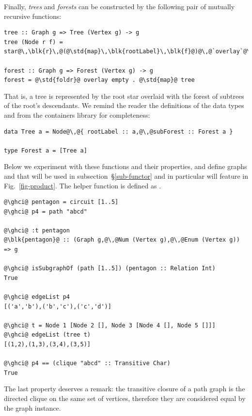 Finally, \emph{trees} and \emph{forests} can be constructed by the following
pair of mutually recursive functions:

\begin{verbatim}
tree :: Graph g => Tree (Vertex g) -> g
tree (Node r f) = star@\,\blk{r}\,@(@\std{map}\,\blk{rootLabel}\,\blk{f}@)@\,@`overlay`@\,\blk{forest}\,f@

forest :: Graph g => Forest (Vertex g) -> g
forest = @\std{foldr}@ overlay empty . @\std{map}@ tree
\end{verbatim}

\noindent
That is, a tree is represented by the root star overlaid with the forest
of subtrees of the root's descendants. We remind the reader the
definitions of the data types  and  from the
\textsf{containers} library for completeness:

\begin{verbatim}
data Tree a = Node@\,@{ rootLabel :: a,@\,@subForest :: Forest a }

type Forest a = [Tree a]
\end{verbatim}

Below we experiment with these functions and their properties, and define
graphs  and  that will be used in subsection~\S\ref{sub-functor}
and in particular will feature in Fig.~\ref{fig-product}. The helper function
 is defined as .

\begin{verbatim}
@\ghci@ pentagon = circuit [1..5]
@\ghci@ p4 = path "abcd"

@\ghci@ :t pentagon
@\blk{pentagon}@ :: (Graph g,@\,@Num (Vertex g),@\,@Enum (Vertex g)) => g

@\ghci@ isSubgraphOf (path [1..5]) (pentagon :: Relation Int)
True

@\ghci@ edgeList p4
[('a','b'),('b','c'),('c','d')]

@\ghci@ t = Node 1 [Node 2 [], Node 3 [Node 4 [], Node 5 []]]
@\ghci@ edgeList (tree t)
[(1,2),(1,3),(3,4),(3,5)]

@\ghci@ p4 == (clique "abcd" :: Transitive Char)
True
\end{verbatim}

The last property deserves a remark: the transitive closure of a path graph
is the directed clique on the same set of vertices, therefore they are considered equal
by the  graph instance.

